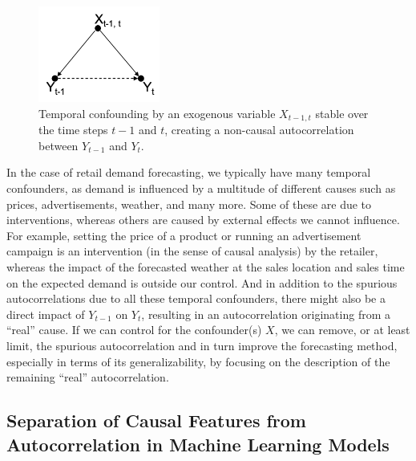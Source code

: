 \documentclass[BCOR=1mm, DIV=calc,10pt,
twoside=true,
twocolumn,
headings=normal]{scrartcl}
\begin{document}
\begin{figure}
\begin{center}
\includegraphics[width=4cm]{figs/temporal_confounding}
\caption{\label{fig:temporal_confounding} Temporal confounding by an exogenous variable $X_{t-1, t}$ stable over the time steps $t-1$ and $t$, creating a non-causal autocorrelation between $Y_{t-1}$ and $Y_t$.}
\end{center}
\end{figure}

In the case of retail demand forecasting, we typically have many temporal confounders, as demand is influenced by a multitude of different causes such as prices, advertisements, weather, and many more. Some of these are due to interventions, whereas others are caused by external effects we cannot influence. For example, setting the price of a product or running an advertisement campaign is an intervention (in the sense of causal analysis) by the retailer, whereas the impact of the forecasted weather at the sales location and sales time on the expected demand is outside our control. And in addition to the spurious autocorrelations due to all these temporal confounders, there might also be a direct impact of $Y_{t-1}$ on $Y_t$, resulting in an autocorrelation originating from a ``real'' cause. If we can control for the confounder(s) $X$, we can remove, or at least limit, the spurious autocorrelation and in turn improve the forecasting method, especially in terms of its generalizability, by focusing on the description of the remaining ``real'' autocorrelation.

\subsection{Separation of Causal Features from Autocorrelation in Machine Learning Models}
\end{document}

